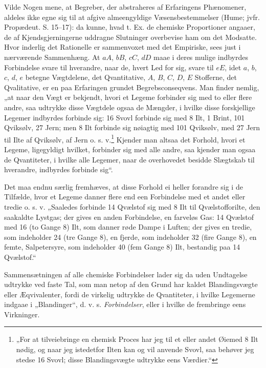 \documentclass[12pt,a4paper]{book}
\begin{document}
Vilde Nogen mene, at Begreber, der abstraheres af Erfaringens
Phænomener, aldeles ikke egne sig til at afgive almeengyldige
Væsensbestemmelser (Hume; jvfr. Propædeut. S. 15--17): da kunne,
hvad t. Ex. de chemiske Proportioner angaaer, de af
Kjendsgjerningerne uddragne Slutninger overbevise ham om det
Modsatte. Hvor inderlig det Rationelle er sammenvoxet med det
Empiriske, sees just i nærværende Sammenhæng. At $aA$, $bB$, $cC$,
$dD$ maae i deres mulige indbyrdes Forbindelse svare til
hverandre, naar de, hvert Led for sig, svare til $eE$, idet $a$,
$b$, $c$, $d$, $e$ betegne Vægtdelene, det Qvantitative, $A$, $B$,
$C$, $D$, $E$ Stofferne, det Qvalitative, er en paa Erfaringen
grundet Begrebsconseqvens. Man finder nemlig, „at naar den Vægt er
bekjendt, hvori et Legeme forbinder sig med to eller flere andre,
saa udtrykke disse Vægtdele ogsaa de Mængder, i hvilke disse
forskjellige Legemer indbyrdes forbinde sig: 16 Svovl forbinde sig
med 8 Ilt, 1 Brint, 101 Qviksølv, 27 Jern; men 8 Ilt forbinde sig
nøiagtig med 101 Qviksølv, med 27 Jern til Ilte af Qviksølv, af
Jern o. s. v.\footnote{„For at tilveiebringe en chemisk Proces har
jeg til et eller andet Øiemed 8 Ilt nødig, og naar jeg istedetfor
Ilten kan og vil anvende Svovl, saa behøver jeg stedse 16 Svovl;
disse Blandingsvægte udtrykke eens Værdier.“}
Kjender man altsaa det Forhold, hvori et Legeme, ligegyldigt
hvilket, forbinder sig med alle andre,
saa kjender man ogsaa de Qvantiteter, i hvilke alle Legemer, naar
de overhovedet besidde Slægtskab til hverandre, indbyrdes forbinde
sig“.

Det maa endnu særlig fremhæves, at disse Forhold ei heller
forandre sig i de Tilfælde, hvor et Legeme danner flere end een
Forbindelse med et andet eller tredie o. s. v. „Saaledes forbinde
14 Qvælstof sig med 8 Ilt til Qvælstofforilte, den saakaldte
Lystgas; der gives en anden Forbindelse, en farveløs Gas: 14
Qvælstof med 16 (to Gange 8) Ilt, som danner røde Dampe i Luften;
der gives en tredie, som indeholder 24 (tre Gange 8), en fjerde,
som indeholder 32 (fire Gange 8), en femte, Salpetersyre, som
indeholder 40 (fem Gange 8) Ilt, bestandig paa 14 Qvælstof.“

Sammensætningen af alle chemiske Forbindelser lader sig da uden
Undtagelse udtrykke ved faste Tal, som man netop af den Grund har
kaldet Blandingsvægte eller Æqvivalenter, fordi de virkelig
udtrykke de Qvantiteter, i hvilke Legemerne indgaae i „Blandinger“,
d. v. s. \emph{Forbindelser}, eller i hvilke de frembringe eens
Virkninger.
\end{document}
